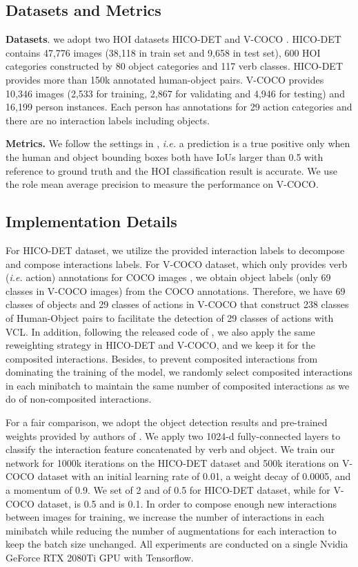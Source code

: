 \documentclass[runningheads]{llncs}
\newcommand{\ie}{\textit{i.e. }}
\begin{document}
\subsection{Datasets and Metrics}
{\bf Datasets}. we adopt two HOI datasets HICO-DET \cite{chao2018learning} and V-COCO \cite{gupta2015visual}.
 HICO-DET \cite{chao2018learning} contains 47,776 images (38,118 in train set and 9,658 in test set),
600 HOI categories constructed by 80 object categories and 117 verb classes. HICO-DET provides more than 150k
 annotated human-object pairs. V-COCO \cite{gupta2015visual} provides 10,346 images (2,533 for
training, 2,867 for validating and 4,946 for testing) and 16,199 person instances.
Each person has annotations for 29 action categories and there are no interaction labels including objects.

{\bf Metrics.} We follow the settings in \cite{gao2018ican}, \ie a prediction is a true positive
only when the human and object bounding boxes both have IoUs larger than 0.5 with reference to ground
truth and the HOI classification result is accurate. We use the role mean average precision to
measure the performance on V-COCO.


\subsection{Implementation Details}


For HICO-DET dataset, we utilize the provided interaction labels to decompose and compose interactions labels.
For V-COCO dataset, which only provides verb (\ie action) annotations for COCO images \cite{lin2014microsoft},
we obtain object labels (only 69 classes in V-COCO images) from the COCO annotations.
Therefore, we have 69 classes of objects and 29 classes of actions in V-COCO that construct 238 classes of
Human-Object pairs to facilitate the detection of 29 classes of actions with VCL.
In addition, following the released code of \cite{li2018transferable},
we also apply the same reweighting strategy in HICO-DET and V-COCO,
and we keep it for the composited interactions. Besides, to prevent composited interactions from dominating the training of the model,
we randomly select composited interactions in each minibatch to maintain the same number of composited interactions as we do of non-composited interactions.

For a fair comparison, we adopt the object detection results
and pre-trained weights provided by authors of \cite{gao2018ican}. We apply two 1024-d fully-connected layers to classify the
interaction feature concatenated by verb and object. We train our network for 1000k iterations on the
HICO-DET dataset and 500k iterations on V-COCO dataset with an initial learning rate of 0.01, a weight decay of 0.0005, and a momentum of 0.9.
We set  of 2 and  of 0.5 for HICO-DET dataset,
while for V-COCO dataset,  is 0.5 and  is 0.1. In order to compose enough new interactions between images for training,
we increase the number of interactions in each minibatch while reducing the number of augmentations for each interaction to keep the batch size unchanged.
All experiments are conducted on a single Nvidia GeForce RTX 2080Ti GPU with Tensorflow.
\end{document}
